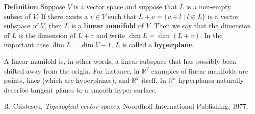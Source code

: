 \documentclass[12pt]{article}
\newcommand{\sR}[0]{\mathbb{R}}
\begin{document}
{\bf Definition}  
Suppose $V$ is a vector space and suppose that $L$ is a 
non-empty subset of $V$. If there exists a $v\in V$ such that $L+v=\{ v+l \mid l\in L\}$
is a vector subspace of $V$, then $L$ is a {\bf linear manifold} of $V$. Then we
say that the dimension of $L$ is the dimension of $L+v$ and write $\dim L = \dim (L+v)$.
In the important case $\dim L = \dim V -1$,  $L$ is called a {\bf hyperplane}.

A linear manifold is, in other words, a linear subspace that has possibly been 
shifted away from the origin. 
For instance, in $\sR^2$ examples of linear 
manifolds are points, lines (which are hyperplanes), and $\sR^2$ itself. 
In $\sR^n$ hyperplanes naturally describe tangent planes to a smooth 
hyper surface. 

\begin{thebibliography}{9}
  R. Cristescu, \emph{Topological vector spaces},
 Noordhoff International Publishing, 1977.
\end{thebibliography}
\end{document}
